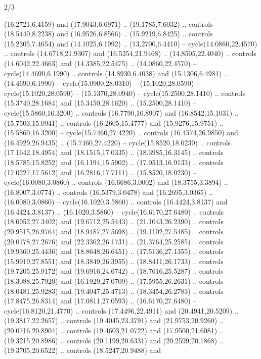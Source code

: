 \begin{flagdescription}{2/3}
\begin{scope}[yshift=\flagwidth,scale=\flagwidth/1241.93737]
\begin{scope}[y=-1mm, x=1mm,draw=gold,fill=blue,line join=miter,miter limit=4,line width=1.8\lw]
\begin{scope}[y=1mm, x=1mm, yscale=-1,shift={(573.68mm+\str,145.75)}]
\begin{scope}[scale=1.35,shift={(-9,-3)}]
\begin{scope}[scale=0.55]
\begin{scope}[scale=1.333]
    (16.2721,6.4159) and (17.9043,6.6971) .. (19.1785,7.6032) .. controls
    (18.5440,8.2238) and (16.9526,6.8566) .. (15.9219,6.8425) .. controls
    (15.2305,7.4654) and (14.1025,6.1992) .. (13.2700,6.4410) --
    cycle(14.0860,22.4570) .. controls (14.6718,21.9307) and (16.5254,21.9468) ..
    (14.8505,22.4040) .. controls (14.6042,22.4663) and (14.3385,22.5475) ..
    (14.0860,22.4570) -- cycle(14.4690,6.1990) .. controls (14.8930,6.4038) and
    (15.1306,6.4981) .. (14.4690,6.1990) -- cycle(15.0900,28.0310) --
    (15.1020,28.0590) -- cycle(15.1020,28.0590) -- (15.1370,28.0940) --
    cycle(15.2500,28.1410) .. controls (15.3740,28.1684) and (15.3450,28.1620) ..
    (15.2500,28.1410) -- cycle(15.5860,16.3200) .. controls (16.7790,16.8907) and
    (16.8542,15.1031) .. (15.7503,15.0941) .. controls (16.2605,15.4777) and
    (15.9276,15.9751) .. (15.5860,16.3200) -- cycle(15.7460,27.4220) .. controls
    (16.4574,26.9850) and (16.4929,26.9435) .. (15.7460,27.4220) --
    cycle(15.8520,18.0230) .. controls (17.1642,18.4954) and (18.1515,17.0335) ..
    (18.3985,16.3145) .. controls (18.5785,15.8252) and (16.1194,15.5902) ..
    (17.0513,16.9133) .. controls (17.0227,17.5612) and (16.2816,17.7111) ..
    (15.8520,18.0230) -- cycle(16.0080,3.0860) .. controls (16.6686,3.0002) and
    (18.3755,3.3894) .. (16.8007,3.0774) .. controls (16.5379,3.0478) and
    (16.2695,3.0365) .. (16.0080,3.0860) -- cycle(16.1020,3.5860) .. controls
    (16.4424,3.8137) and (16.4424,3.8137) .. (16.1020,3.5860) --
    cycle(16.6170,27.6480) .. controls (18.0952,27.3402) and (19.6712,25.5443) ..
    (21.1043,26.2390) .. controls (20.9515,26.9764) and (18.9487,27.5698) ..
    (19.1102,27.5485) .. controls (20.0178,27.2676) and (22.3362,26.1731) ..
    (21.3764,25.2585) .. controls (19.9360,25.4436) and (18.8648,26.6451) ..
    (17.5136,27.1355) .. controls (15.9919,27.8551) and (18.3849,26.3955) ..
    (18.8411,26.1733) .. controls (19.7205,25.9172) and (19.6916,24.6742) ..
    (18.7616,25.5287) .. controls (18.3088,25.7920) and (16.1929,27.0709) ..
    (17.5955,26.2631) .. controls (18.0481,25.9283) and (19.4047,25.4713) ..
    (18.3454,26.2783) .. controls (17.8475,26.8314) and (17.0811,27.0593) ..
    (16.6170,27.6480) -- cycle(16.8120,21.4770) .. controls (17.4496,22.4911) and
    (20.4941,20.5209) .. (19.3817,22.2657) .. controls (19.4045,23.3791) and
    (21.9753,20.9260) .. (20.0716,20.8904) .. controls (19.4603,21.0722) and
    (17.9500,21.6081) .. (19.3215,20.8986) .. controls (20.1199,20.6331) and
    (20.2599,20.1868) .. (19.3705,20.6522) .. controls (18.5247,20.9488) and

\end{scope}
\end{scope}
\end{scope}
\end{scope}
\end{scope}
\end{scope}
\end{flagdescription}
